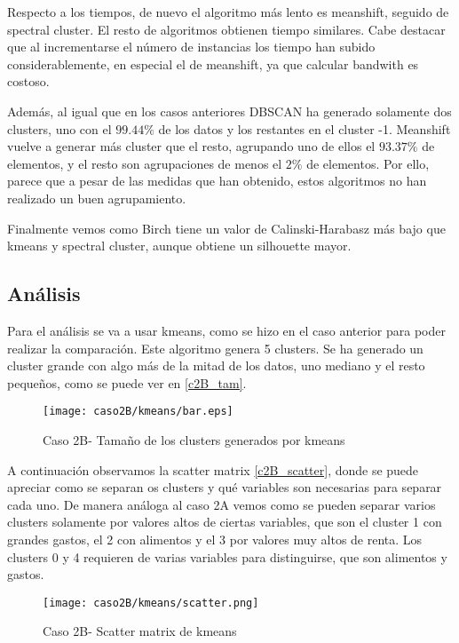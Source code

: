 Respecto a los tiempos, de nuevo el algoritmo más lento es meanshift, seguido de spectral cluster. El resto de algoritmos obtienen tiempo similares. Cabe destacar que al incrementarse el número de instancias los tiempo han subido considerablemente, en especial el de meanshift, ya que calcular bandwith es costoso.

Además, al igual que en los casos anteriores DBSCAN ha generado solamente dos clusters, uno con el $99.44\%$ de los datos y los restantes en el cluster -1. Meanshift vuelve a generar más cluster que el resto, agrupando uno de ellos el $93.37\%$ de elementos, y el resto son  agrupaciones de menos el $2\%$ de elementos. Por ello, parece que a pesar de las medidas que han obtenido, estos algoritmos no han realizado un buen agrupamiento.

Finalmente vemos como Birch tiene un valor de Calinski-Harabasz más bajo que kmeans y spectral cluster, aunque obtiene un silhouette mayor.

\subsection{Análisis}


Para el análisis se va a usar kmeans, como se hizo en el caso anterior para poder realizar la comparación. Este algoritmo genera 5 clusters. Se ha generado un cluster grande con algo más de la mitad de los datos, uno mediano y el resto pequeños, como se puede ver en \eqref{c2B_tam}.

\begin{figure}[H]
\caption{Caso 2B- Tamaño de los clusters generados por kmeans}
\label{c2B_tam}
\texttt{[image: caso2B/kmeans/bar.eps]}
\end{figure}

A continuación observamos la scatter matrix \eqref{c2B_scatter}, donde se puede apreciar como se separan os clusters y qué variables son necesarias para separar cada uno. De manera análoga al caso 2A vemos como se pueden separar varios clusters solamente por valores altos de ciertas variables, que son el cluster 1 con grandes gastos, el 2 con alimentos y el 3 por valores muy altos de renta. Los clusters 0 y 4 requieren de varias variables para distinguirse, que son alimentos y gastos.

\begin{figure}[H]
\caption{Caso 2B- Scatter matrix de kmeans}
\label{c2B_scatter}
\texttt{[image: caso2B/kmeans/scatter.png]}
\end{figure}


